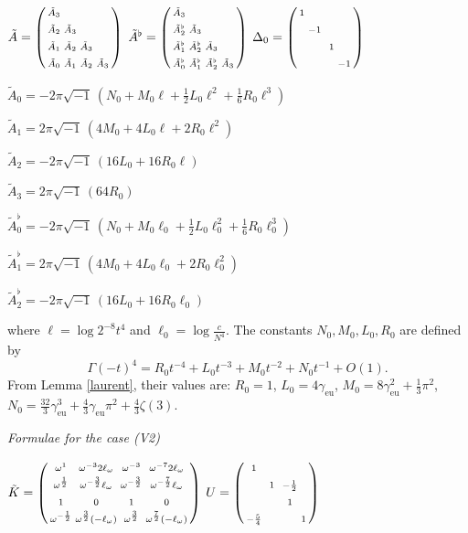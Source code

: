 \documentclass[a4paper,12pt,leqno]{amsart}
\numberwithin{equation}{section}
\theoremstyle{plain}
\theoremstyle{definition}
\newcommand{\De}{\Delta}
\newcommand{\om}{\omega}
\newcommand{\Ga}{\Gamma}
\newcommand{\no}{\noindent}
\newcommand{\bsp}{\left(\begin{smallmatrix}}
\newcommand{\esp}{\end{smallmatrix}\right)}
\newcommand{\ii}{ {\scriptstyle\sqrt{-1}}\, }
\newcommand{\eo}{\ell_\om}
\newcommand{\euler}{\gamma_{\scriptscriptstyle\text{eu}}}
\begin{document}
{$
\tilde A=
\bsp
\vphantom\sph
\tilde A_3 & & & 
\\
\vphantom\sph
\tilde A_2 & \tilde A_3 & & 
\\
\vphantom\sph
\tilde A_1 & \tilde A_2 & \tilde A_3 &
 \\
 \vphantom\sph
\tilde A_0 & \tilde A_1 & \tilde A_2 & \tilde A_3 
\esp
$
\quad
$
\tilde A^\flat=
\bsp
\vphantom\sph
\tilde A_3 & & & 
\\
\vphantom\sph
\tilde A^\flat_2 & \tilde A_3 & & 
\\
\vphantom\sph
\tilde A^\flat_1 & \tilde A^\flat_2 & \tilde A_3 &
 \\
 \vphantom\sph
\tilde A^\flat_0 & \tilde A^\flat_1 & \tilde A^\flat_2 & \tilde A_3 
\esp
$
\quad
$\De_0=
\bsp 
\vphantom\sph
1 & & & \\
\vphantom\sph  
& -1 & & \\
\vphantom\sph 
& & \ 1 & \\
\vphantom\sph 
& & & -1\esp
$

$\tilde A_0 =
-2\pi\ii
(N_0 + M_0 \ell + \tfrac12 L_0  \ell^2 + \tfrac16 R_0  \ell^3)$

$\tilde A_1 = 
2\pi\ii (4M_0 + 4L_0 \ell  + 2R_0 \ell^2)$

$\tilde A_2 = 
-2\pi\ii
(16L_0 + 16R_0 \ell)$

$\tilde A_3 = 
2\pi\ii (64 R_0)$

\smallskip

$\tilde A^\flat_0 =-2\pi\ii
(N_0 + M_0 \ell_0 + \tfrac12 L_0  \ell_0^2 + \tfrac16 R_0  \ell_0^3)$

$\tilde A^\flat_1 =2\pi\ii (4M_0 + 4L_0 \ell_0  + 2R_0 \ell_0^2)$

$\tilde A^\flat_2 =-2\pi\ii
(16L_0 + 16R_0 \ell_0)$

\no where $\ell=\log 2^{-8}t^4$ and $\ell_0=\log\frac{c}{N^4}$.
The constants $N_0,M_0,L_0,R_0$ are defined by
\[
\Ga(-t)^4=R_0t^{-4}+L_0t^{-3}+M_0t^{-2}+N_0t^{-1}+ O(1).
\]
From Lemma \ref{laurent}, their values are:
$R_0=1$,
$L_0=4\euler$,
$M_0=8\euler^2 +\tfrac13\pi^2$,
$N_0=\tfrac{32}3 \euler^3 +\tfrac43\euler\pi^2 +\tfrac43\zeta(3)$.

\begin{center}
{\em Formulae for the case (V2)}
\end{center}

$
\tilde K=
\bsp
\vphantom\sph
\om^{1} & \om^{-3}2\eo & \om^{-3} & \om^{-7}2\eo
\\
\vphantom\sph
\om^{\frac12} & \om^{-\frac32}\eo & \om^{-\frac32} & \om^{-\frac72}\eo
\\
\vphantom\sph
1 & 0 & 1 & 0 
\\
\vphantom\sph
\om^{-\frac12} & \om^{\frac32}(-\eo) & \om^{\frac32} & \om^{\frac72}(-\eo)
\esp
$
\quad
$
U=\bsp
\vphantom\sph
1 & &  &
\\
\vphantom\sph
 & \ 1\  & -\frac12 &
\\
\vphantom\sph
 & & 1 &
\\
\vphantom\sph
-\frac54 & & & 1
\esp
$


}
\end{document}
